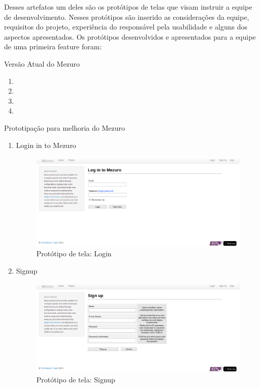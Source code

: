 Desses artefatos um deles são os protótipos de telas que visam instruir a equipe de desenvolvimento. Nesses protótipos são inserido as considerações da equipe, requisitos do projeto, experiência do responsável pela usabilidade e alguns dos aspectos apresentados. Os protótipos desenvolvidos e apresentados para a equipe de uma primeira feature foram:

Versão Atual do Mezuro
\begin{enumerate}
	\item
	\item
	\item
	\item
\end{enumerate}

Prototipação para melhoria do Mezuro
\begin{enumerate}
\item Login in to Mezuro 
\begin{figure}[H]
  \begin{center}
    \includegraphics[width=1\textwidth]{figuras/Login.eps}
    \caption{Protótipo de tela: Login}
    \label{fig:pLogin}
  \end{center}
\end{figure}

\item Signup
\begin{figure}[H]
  \begin{center}
    \includegraphics[width=1\textwidth]{figuras/Signup.eps}
    \caption{Protótipo de tela: Signup}
    \label{fig:pSignup}
  \end{center}
\end{figure}


\end{enumerate}
